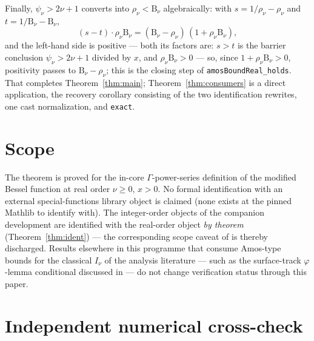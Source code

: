 \documentclass[11pt]{article}
\newcommand{\lean}[1]{\texttt{#1}}
\newcommand{\RHS}{\mathrm{B}}
\begin{document}
Finally, $\psi_\nu > 2\nu+1$ converts into $\rho_\nu < \RHS_\nu$
algebraically: with $s = 1/\rho_\nu - \rho_\nu$ and
$t = 1/\RHS_\nu - \RHS_\nu$,
\[
(s - t)\cdot \rho_\nu \RHS_\nu
= (\RHS_\nu - \rho_\nu)\,(1 + \rho_\nu \RHS_\nu),
\]
and the left-hand side is positive --- both its factors are:
$s > t$ is the barrier conclusion $\psi_\nu > 2\nu+1$ divided by
$x$, and $\rho_\nu \RHS_\nu > 0$ --- so, since
$1 + \rho_\nu \RHS_\nu > 0$, positivity passes to
$\RHS_\nu - \rho_\nu$; this is the closing step of
\lean{amosBoundReal\_holds}.  That completes
Theorem~\ref{thm:main}; Theorem~\ref{thm:consumers} is a direct
application, the recovery corollary consisting of the two
identification rewrites, one cast normalization, and \lean{exact}.

\section{Scope}\label{sec:scope}

The theorem is proved for the in-core $\Gamma$-power-series
definition of the modified Bessel function at real order
$\nu \ge 0$, $x > 0$.  No formal identification with an external
special-functions library object is claimed (none exists at the
pinned Mathlib to identify with).  The integer-order objects of the
companion development are identified with the real-order object
\emph{by theorem} (Theorem~\ref{thm:ident}) --- the corresponding
scope caveat of \cite{ErikssonC3} is thereby discharged.  Results
elsewhere in this programme that consume Amos-type bounds for the
classical $I_\nu$ of the analysis literature --- such as the
surface-track $\varphi$-lemma conditional discussed in
\cite{ErikssonC2} --- do not change verification status through
this paper.

\section{Independent numerical cross-check}\label{sec:crosscheck}
\end{document}
